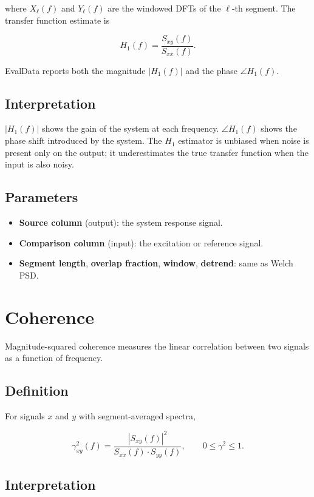 \documentclass[11pt,a4paper]{article}
\begin{document}
where $X_\ell(f)$ and $Y_\ell(f)$ are the windowed DFTs of the $\ell$-th segment. The transfer function estimate is

\[
H_1(f) = \frac{S_{xy}(f)}{S_{xx}(f)}.
\]

EvalData reports both the magnitude $|H_1(f)|$ and the phase $\angle H_1(f)$.

\subsection{Interpretation}

$|H_1(f)|$ shows the gain of the system at each frequency. $\angle H_1(f)$ shows the phase shift introduced by the system. The $H_1$ estimator is unbiased when noise is present only on the output; it underestimates the true transfer function when the input is also noisy.

\subsection{Parameters}

\begin{itemize}
    \item \textbf{Source column} (output): the system response signal.
    \item \textbf{Comparison column} (input): the excitation or reference signal.
    \item \textbf{Segment length}, \textbf{overlap fraction}, \textbf{window}, \textbf{detrend}: same as Welch PSD.
\end{itemize}

\section{Coherence}

Magnitude-squared coherence measures the linear correlation between two signals as a function of frequency.

\subsection{Definition}

For signals $x$ and $y$ with segment-averaged spectra,

\[
\gamma^2_{xy}(f) = \frac{|S_{xy}(f)|^2}{S_{xx}(f) \cdot S_{yy}(f)}, \qquad 0 \le \gamma^2 \le 1.
\]

\subsection{Interpretation}
\end{document}
